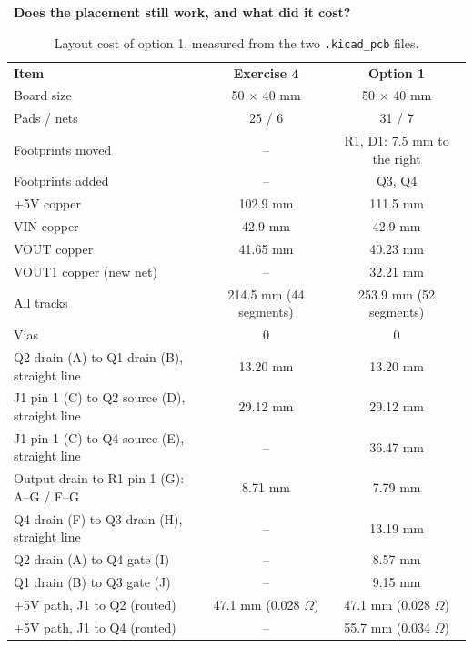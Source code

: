 \documentclass[11pt,a4paper]{article}
\newcommand{\lab}[2]{\Needspace{5\baselineskip}\vspace{6pt}{\sffamily\bfseries\color{teal}\large #1}\ {\sffamily\bfseries\color{ink}#2}\par\vspace{-2pt}{\color{amber}\rule{2.2em}{1.4pt}}\par\vspace{2pt}}
\begin{document}
\lab{1.3}{Does the placement still work, and what did it cost?}
\begin{table}[H]\centering\small\sffamily
\begin{tabular}{@{}lcc@{}}\rowcolor{teal}\color{white}\textbf{Item}&\color{white}\textbf{Exercise 4}&\color{white}\textbf{Option 1}\\
Board size&50 $\times$ 40 mm&50 $\times$ 40 mm\\
\rowcolor{mist}Pads / nets&25 / 6&31 / 7\\
Footprints moved&--&R1, D1: 7.5 mm to the right\\
\rowcolor{mist}Footprints added&--&Q3, Q4\\
+5V copper&102.9 mm&111.5 mm\\
\rowcolor{mist}VIN copper&42.9 mm&42.9 mm\\
VOUT copper&41.65 mm&40.23 mm\\
\rowcolor{mist}VOUT1 copper (new net)&--&32.21 mm\\
All tracks&214.5 mm (44 segments)&253.9 mm (52 segments)\\
\rowcolor{mist}Vias&0&0\\
Q2 drain (A) to Q1 drain (B), straight line&13.20 mm&13.20 mm\\
\rowcolor{mist}J1 pin 1 (C) to Q2 source (D), straight line&29.12 mm&29.12 mm\\
J1 pin 1 (C) to Q4 source (E), straight line&--&36.47 mm\\
\rowcolor{mist}Output drain to R1 pin 1 (G): A--G / F--G&8.71 mm&7.79 mm\\
Q4 drain (F) to Q3 drain (H), straight line&--&13.19 mm\\
\rowcolor{mist}Q2 drain (A) to Q4 gate (I)&--&8.57 mm\\
Q1 drain (B) to Q3 gate (J)&--&9.15 mm\\
\rowcolor{mist}+5V path, J1 to Q2 (routed)&47.1 mm (0.028 $\Omega$)&47.1 mm (0.028 $\Omega$)\\
+5V path, J1 to Q4 (routed)&--&55.7 mm (0.034 $\Omega$)\\\end{tabular}
\caption{Layout cost of option 1, measured from the two \texttt{.kicad\_pcb} files.}\end{table}
\end{document}

